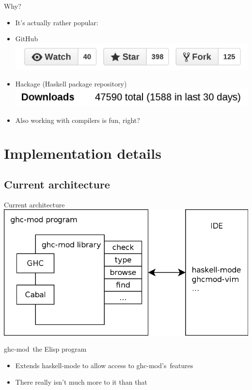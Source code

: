 \documentclass{beamer}
\newcommand\gm{{\Rokkitt ghc-mod}\ }
\newcommand\gms{{\Rokkitt ghc-mod's}\ }
\begin{document}
\begin{frame}{Why?}
  \begin{itemize}
  \item It's actually rather popular: \vspace{1em}

  \item GitHub
    \includegraphics[width=\textwidth]{gh-stars}

  \item Hackage (Haskell package repository)
    \includegraphics[width=\textwidth]{hackage-dls}

  \item Also working with compilers is fun, right?
  \end{itemize}
\end{frame}


\section{Implementation details}

\subsection{Current architecture}
\begin{frame}{Current architecture}
  \includegraphics[width=\textwidth]{current-architecture}
\end{frame}

\begin{frame}{\gm the Elisp program}
  \begin{itemize}
  \item Extends haskell-mode to allow access to \gms features
  \item There really isn't much more to it than that
  \end{itemize}
\end{frame}
\end{document}
